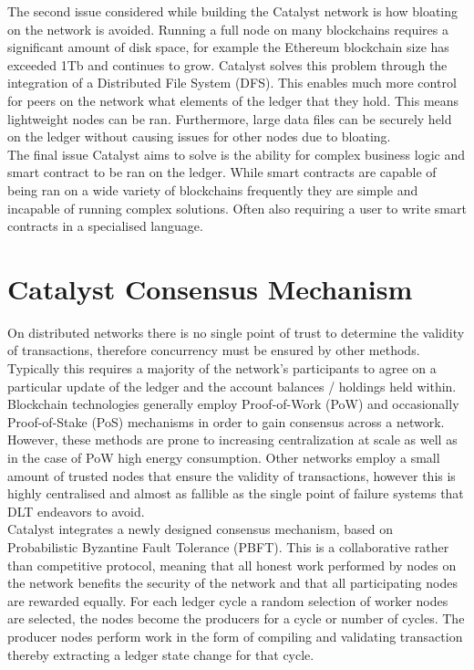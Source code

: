 \documentclass{article}
\begin{document}
The second issue considered while building the Catalyst network is how bloating on the network is avoided. Running a full node on many blockchains requires a significant amount of disk space, for example the Ethereum blockchain size has exceeded 1Tb \cite{EthBloat} and continues to grow. Catalyst solves this problem through the integration of a Distributed File System (DFS). This enables much more control for peers on the network what elements of the ledger that they hold. This means lightweight nodes can be ran. Furthermore, large data files can be securely held on the ledger without causing issues for other nodes due to bloating. \\

The final issue Catalyst aims to solve is the ability for complex business logic and smart contract to be ran on the ledger. While smart contracts are capable of being ran on a wide variety of blockchains frequently they are simple and incapable of running complex solutions. Often also requiring a user to write smart contracts in a specialised language. \\


\section{Catalyst Consensus Mechanism} 

On distributed networks there is no single point of trust to determine the validity of transactions, therefore concurrency must be ensured by other methods. Typically this requires a majority of the network's participants to agree on a particular update of the ledger and the account balances / holdings held within. Blockchain technologies generally employ Proof-of-Work (PoW) and occasionally Proof-of-Stake (PoS) mechanisms in order to gain consensus across a network. However, these methods are prone to increasing centralization at scale as well as in the case of PoW high energy consumption. Other networks employ a small amount of trusted nodes that ensure the validity of transactions, however this is highly centralised and almost as fallible as the single point of failure systems that DLT endeavors to avoid. \\

Catalyst integrates a newly designed consensus mechanism, based on Probabilistic Byzantine Fault Tolerance (PBFT).  This is a collaborative rather than competitive protocol, meaning that all honest work performed by nodes on the network benefits the security of the network and that all participating nodes are rewarded equally. For each ledger cycle a random selection of worker nodes are selected, the nodes become the producers for a cycle or number of cycles. The producer nodes perform work in the form of compiling and validating transaction thereby extracting a ledger state change for that cycle. \\
\end{document}
